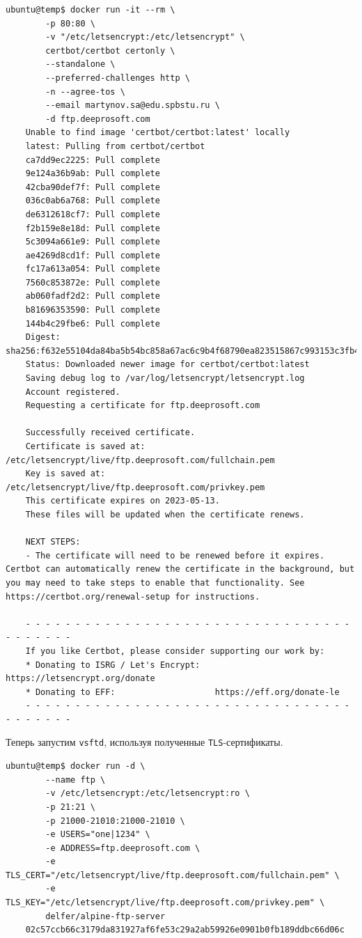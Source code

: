\begin{Verbatim}[frame=single]
    ubuntu@temp$ docker run -it --rm \
        -p 80:80 \
        -v "/etc/letsencrypt:/etc/letsencrypt" \
        certbot/certbot certonly \
        --standalone \
        --preferred-challenges http \
        -n --agree-tos \
        --email martynov.sa@edu.spbstu.ru \
        -d ftp.deeprosoft.com
    Unable to find image 'certbot/certbot:latest' locally
    latest: Pulling from certbot/certbot
    ca7dd9ec2225: Pull complete 
    9e124a36b9ab: Pull complete 
    42cba90def7f: Pull complete 
    036c0ab6a768: Pull complete 
    de6312618cf7: Pull complete 
    f2b159e8e18d: Pull complete 
    5c3094a661e9: Pull complete 
    ae4269d8cd1f: Pull complete 
    fc17a613a054: Pull complete 
    7560c853872e: Pull complete 
    ab060fadf2d2: Pull complete 
    b81696353590: Pull complete 
    144b4c29fbe6: Pull complete 
    Digest: sha256:f632e55104da84ba5b54bc858a67ac6c9b4f68790ea823515867c993153c3fb4
    Status: Downloaded newer image for certbot/certbot:latest
    Saving debug log to /var/log/letsencrypt/letsencrypt.log
    Account registered.
    Requesting a certificate for ftp.deeprosoft.com

    Successfully received certificate.
    Certificate is saved at: /etc/letsencrypt/live/ftp.deeprosoft.com/fullchain.pem
    Key is saved at:         /etc/letsencrypt/live/ftp.deeprosoft.com/privkey.pem
    This certificate expires on 2023-05-13.
    These files will be updated when the certificate renews.

    NEXT STEPS:
    - The certificate will need to be renewed before it expires. Certbot can automatically renew the certificate in the background, but you may need to take steps to enable that functionality. See https://certbot.org/renewal-setup for instructions.

    - - - - - - - - - - - - - - - - - - - - - - - - - - - - - - - - - - - - - - - -
    If you like Certbot, please consider supporting our work by:
    * Donating to ISRG / Let's Encrypt:   https://letsencrypt.org/donate
    * Donating to EFF:                    https://eff.org/donate-le
    - - - - - - - - - - - - - - - - - - - - - - - - - - - - - - - - - - - - - - - -
\end{Verbatim}

Теперь запустим \texttt{vsftd}, используя полученные \texttt{TLS}-сертификаты.

\begin{Verbatim}[frame=single]
    ubuntu@temp$ docker run -d \
        --name ftp \
        -v /etc/letsencrypt:/etc/letsencrypt:ro \
        -p 21:21 \
        -p 21000-21010:21000-21010 \
        -e USERS="one|1234" \
        -e ADDRESS=ftp.deeprosoft.com \
        -e TLS_CERT="/etc/letsencrypt/live/ftp.deeprosoft.com/fullchain.pem" \
        -e TLS_KEY="/etc/letsencrypt/live/ftp.deeprosoft.com/privkey.pem" \
        delfer/alpine-ftp-server
    02c57ccb66c3179da831927af6fe53c29a2ab59926e0901b0fb189ddbc66d06c
\end{Verbatim}

